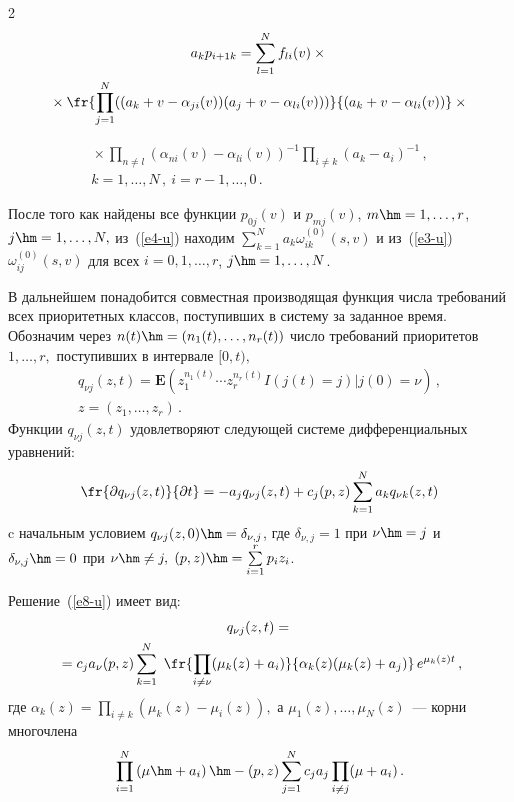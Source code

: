 \begin{multicols}{2}
\noindent
\begin{multline*}
a_kp_{i+1k}=\sum\limits_{l=1}^N f_{li}(v)\times{}\\
{}\times
\fr{\prod\limits_{j=1}^N((a_k+v-\alpha_{ji}(v))(a_j+v-\alpha_{li}(v)))}
{(a_k+v-\alpha_{li}(v))}\times{}
\end{multline*}

\noindent
\begin{multline*}
{}\times
\prod\limits_{n\ne l}(\alpha_{ni}(v)-\alpha_{li}(v))^{-1}
\prod\limits_{i\ne k}(a_k-a_i)^{-1}\,,\\
k=1,\ldots,N\,,\ i=r-1,\ldots,0\,.
\end{multline*}

После того как найдены все функции $p_{0j}(v)$ и $p_{mj}(v)$, $m\hm=1,\ldots,r$, 
$j\hm=1,\ldots,N,$ из~(\ref{e4-u}) находим
$\sum\limits_{k=1}^N a_k \omega_{ik}^{(0)}(s,v)$ и из~(\ref{e3-u}) 
$\omega_{ij}^{(0)}(s,v)$ для всех $i=0,1,\ldots,r$, $j\hm=1,\ldots,N$.

В дальнейшем понадобится совместная производящая функция чис\-ла требований всех 
приоритетных классов, поступивших в систему за заданное
время. Обозначим через $n(t)\hm=(n_1(t),\ldots,n_r(t))$ чис\-ло 
требований приоритетов $1,\ldots,r,$ поступивших в интервале $[0,t),$
\begin{multline*}
\!\!q_{\nu j}(z,t)=\mathbf{E}\left(z_1^{n_1(t)}\cdots z_r^{n_r(t)}I(j(t)=j)|j(0)=\nu\right)\,,\\ 
z=(z_1,\ldots,z_r)\,.
\end{multline*}
Функции $q_{\nu j}(z,t)$ удовлетворяют
следующей системе дифференциальных уравнений:
\begin{equation}
\label{e8-u}
\fr{\partial q_{\nu j}(z,t)}{\partial t}=-a_j q_{\nu j}(z,t)+c_j (p,z)
\sum\limits_{k=1}^N a_k q_{\nu k}(z,t)
\end{equation}
c начальным условием $q_{\nu j}(z,0)\hm=\delta_{\nu,j}$, 
где $\delta_{\nu,j}=1$ при $\nu\hm=j$ и $\delta_{\nu,j}\hm=0$ 
при $\nu\hm\ne j,$  $(p,z)\hm=\sum\limits_{i=1}^rp_i z_i$.

Решение~(\ref{e8-u}) имеет вид:
\begin{multline}
\label{e9-u}
q_{\nu j}(z,t)={}\\
{}=c_ja_{\nu}(p,z)\sum\limits_{k=1}^N\ 
\fr{\prod\limits_{i\ne\nu}(\mu_k(z)+a_i)}{\alpha_k(z)(\mu_k(z)+a_j)}\, e^{\mu_k(z)t}\,,
\end{multline}
где $\alpha_k(z)=\prod\limits_{i\ne k}(\mu_k(z)-\mu_i(z)),$ а $\mu_1(z),\ldots,\mu_N(z)$~--- 
корни многочлена
\begin{equation*}
\prod\limits_{i=1}^N\left(\mu\hm+a_i\right)\hm-(p,z) 
\sum\limits_{j=1}^N c_j a_j\prod\limits_{i\ne j}(\mu+a_i)\,.
\end{equation*}


\end{multicols}

